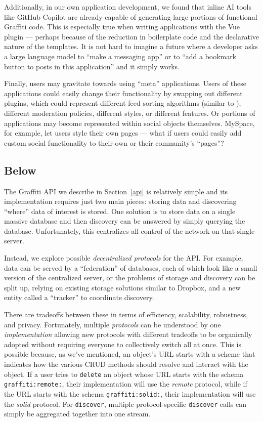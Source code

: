 Additionally, in our own application development,
we found that inline AI tools like GitHub Copilot are already
capable of generating large portions of functional Graffiti code.
This is especially true when writing applications with the
Vue plugin --- perhaps because of the reduction in boilerplate
code and the declarative nature of the templates.
It is not hard to imagine a future where a developer asks
a large language model to ``make a messaging app''
or to ``add a bookmark button to posts in this application'' and
it simply works.

Finally, users may gravitate towards using ``meta'' applications.
Users of these applications could easily change their functionality
by swapping out different plugins,
which could represent different feed sorting algorithms
(similar to \cite{threeleggedstool, bluesky}),
different moderation policies, different styles,
or different features.
Or portions of applications may become represented within social objects themselves.
MySpace, for example, let users style their own pages --- what if users could easily add
custom social functionality to their own
or their community's ``pages''?

\subsection{Below}

The Graffiti API we describe in Section~\ref{api} is relatively
simple and its implementation requires just two main pieces:
storing data and discovering ``where'' data of interest is stored.
One solution is to store data on a single massive database
and then discovery can be answered by simply querying the database.
Unfortunately, this centralizes all control of the network
on that single server.

Instead, we explore possible \emph{decentralized protocols}
for the API. For example, data can be served by a ``federation'' of databases,
each of which look like a small version of the centralized server,
or the problems of storage and discovery can be split up,
relying on existing storage solutions similar to Dropbox,
and a new entity called a ``tracker'' to coordinate discovery.

There are tradeoffs between these in terms of efficiency, scalability,
robustness, and privacy. Fortunately, multiple \emph{protocols} can
be understood by one \emph{implementation} allowing new protocols
with different tradeoffs to be organically adopted without requiring
everyone to collectively switch all at once.
This is possible because, as we've mentioned, an object's URL starts with a scheme that indicates
how the various CRUD methods should resolve and interact with the object.
If a user tries to \texttt{delete} an object whose URL starts with the schema
\texttt{graffiti:remote:}, their implementation will use the \emph{remote}
protocol, while if the URL starts with the schema \texttt{graffiti:solid:},
their implementation will use the \emph{solid} protocol.
For \texttt{discover}, multiple protocol-specific \texttt{discover}
calls can simply be aggregated together into one stream.

